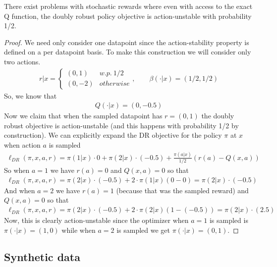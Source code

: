 \begin{subappendices}
\begin{lemma}[Instability of DR]\label{lem:dr_unstable}
There exist problems with stochastic rewards where even with access to the exact Q function, the doubly robust policy objective is action-unstable with probability 1/2.
\end{lemma}

\begin{proof}
We need only consider one datapoint since the action-stability property is defined on a per datapoint basis. To make this construction we will consider only two actions.
\begin{align}
    r|x = \begin{cases} (0, 1) & w.p.\ 1/2\\ (0, -2) & otherwise\end{cases}, \qquad \beta(\cdot|x) = (1/2, 1/2)
\end{align}
So, we know that
\begin{align}
    Q(\cdot|x) = (0,-0.5)
\end{align}
Now we claim that when the sampled datapoint has $ r = (0,1)$ the doubly robust objective is action-unstable (and this happens with probability 1/2 by construction).
We can explicitly expand the DR objective for the policy $ \pi$ at $ x $ when action $ a $ is sampled
\begin{align}
    \ell_{DR}(\pi, x, a, r) = \pi(1|x) \cdot 0 + \pi(2|x) \cdot (-0.5) + \frac{\pi(a|x)}{1/2}(r(a) - Q(x,a))
\end{align}
So when $a = 1$ we have $ r(a) = 0$ and $ Q(x,a) = 0$ so that
\begin{align}
    \ell_{DR}(\pi, x, a, r) = \pi(2|x) \cdot (-0.5) + 2 \cdot \pi(1|x)(0 - 0) = \pi(2|x) \cdot (-0.5)
\end{align}
And when $ a=2$ we have $ r(a) = 1$ (because that was the sampled reward) and $ Q(x,a) = 0$ so that
\begin{align}
    \ell_{DR}(\pi, x, a, r) = \pi(2|x) \cdot (-0.5)  + 2 \cdot \pi(2|x) (1 - (-0.5)) = \pi(2|x) \cdot (2.5)
\end{align}
Now, this is clearly action-unstable since the optimizer when $ a=1 $ is sampled is $ \pi(\cdot|x) = (1,0)$ while when $ a = 2$ is sampled we get $ \pi(\cdot|x) = (0,1)$.
\end{proof}





\label{app:experiments}

\subsection{Synthetic data}


\end{subappendices}
